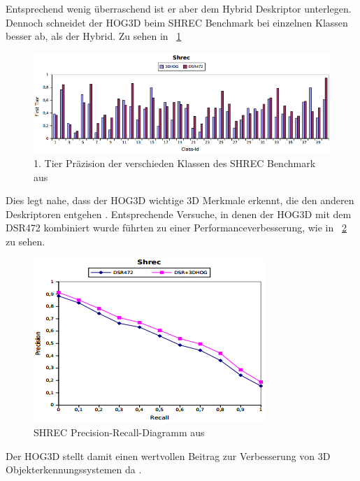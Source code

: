  Entsprechend wenig überraschend ist er aber dem Hybrid Deskriptor unterlegen. Dennoch schneidet der HOG3D beim SHREC Benchmark bei einzelnen Klassen besser ab, als der Hybrid. Zu sehen in \figurename~\ref{SHREC_HOG3D_DSR472} 

 \begin{figure}[thpb]
 	\centering
 	\includegraphics[width=\linewidth]{2-Hauptteil/pics/SHREC_HOG3D_DSR472.png}
 	\caption{1. Tier Präzision der verschieden Klassen des SHREC Benchmark aus \cite{scherer2010histograms}}
 	\label{SHREC_HOG3D_DSR472}
 \end{figure}
 
 Dies legt nahe, dass der HOG3D wichtige 3D Merkmale erkennt, die den anderen Deskriptoren entgehen \cite{scherer2010histograms}.
\newline
Entsprechende Versuche, in denen der HOG3D mit dem DSR472 kombiniert wurde führten zu einer Performanceverbesserung, wie in \figurename~\ref{SHREC_TEAM_HOG3D_DSR472} zu sehen. 

\begin{figure}[thpb]
	\centering
	\includegraphics[width=\linewidth]{2-Hauptteil/pics/SHREC_TEAM_HOG3D_DSR472.png}
	\caption{SHREC Precision-Recall-Diagramm aus \cite{scherer2010histograms}}
	\label{SHREC_TEAM_HOG3D_DSR472}
\end{figure}

Der HOG3D stellt damit einen wertvollen Beitrag zur Verbesserung von 3D Objekterkennungssystemen da \cite{scherer2010histograms}.
